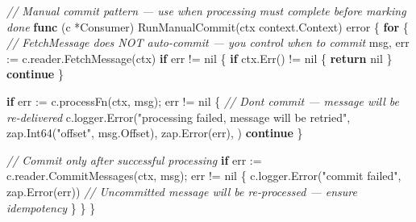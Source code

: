 \documentclass[
]{article}
\newenvironment{Shaded}{}{}
\newcommand{\CommentTok}[1]{\textcolor[rgb]{0.38,0.63,0.69}{\textit{#1}}}
\newcommand{\ControlFlowTok}[1]{\textcolor[rgb]{0.00,0.44,0.13}{\textbf{#1}}}
\newcommand{\DataTypeTok}[1]{\textcolor[rgb]{0.56,0.13,0.00}{#1}}
\newcommand{\KeywordTok}[1]{\textcolor[rgb]{0.00,0.44,0.13}{\textbf{#1}}}
\newcommand{\NormalTok}[1]{#1}
\newcommand{\OperatorTok}[1]{\textcolor[rgb]{0.40,0.40,0.40}{#1}}
\newcommand{\OtherTok}[1]{\textcolor[rgb]{0.00,0.44,0.13}{#1}}
\newcommand{\StringTok}[1]{\textcolor[rgb]{0.25,0.44,0.63}{#1}}
\begin{document}
\begin{Shaded}
\begin{Highlighting}[]
\CommentTok{// Manual commit pattern — use when processing must complete before marking done}
\KeywordTok{func} \OperatorTok{(}\NormalTok{c }\OperatorTok{*}\NormalTok{Consumer}\OperatorTok{)}\NormalTok{ RunManualCommit}\OperatorTok{(}\NormalTok{ctx context}\OperatorTok{.}\NormalTok{Context}\OperatorTok{)} \DataTypeTok{error} \OperatorTok{\{}
    \ControlFlowTok{for} \OperatorTok{\{}
        \CommentTok{// FetchMessage does NOT auto{-}commit — you control when to commit}
\NormalTok{        msg}\OperatorTok{,}\NormalTok{ err }\OperatorTok{:=}\NormalTok{ c}\OperatorTok{.}\NormalTok{reader}\OperatorTok{.}\NormalTok{FetchMessage}\OperatorTok{(}\NormalTok{ctx}\OperatorTok{)}
        \ControlFlowTok{if}\NormalTok{ err }\OperatorTok{!=} \OtherTok{nil} \OperatorTok{\{}
            \ControlFlowTok{if}\NormalTok{ ctx}\OperatorTok{.}\NormalTok{Err}\OperatorTok{()} \OperatorTok{!=} \OtherTok{nil} \OperatorTok{\{}
                \ControlFlowTok{return} \OtherTok{nil}
            \OperatorTok{\}}
            \ControlFlowTok{continue}
        \OperatorTok{\}}

        \ControlFlowTok{if}\NormalTok{ err }\OperatorTok{:=}\NormalTok{ c}\OperatorTok{.}\NormalTok{processFn}\OperatorTok{(}\NormalTok{ctx}\OperatorTok{,}\NormalTok{ msg}\OperatorTok{);}\NormalTok{ err }\OperatorTok{!=} \OtherTok{nil} \OperatorTok{\{}
            \CommentTok{// Don\textquotesingle{}t commit — message will be re{-}delivered}
\NormalTok{            c}\OperatorTok{.}\NormalTok{logger}\OperatorTok{.}\NormalTok{Error}\OperatorTok{(}\StringTok{"processing failed, message will be retried"}\OperatorTok{,}
\NormalTok{                zap}\OperatorTok{.}\NormalTok{Int64}\OperatorTok{(}\StringTok{"offset"}\OperatorTok{,}\NormalTok{ msg}\OperatorTok{.}\NormalTok{Offset}\OperatorTok{),}
\NormalTok{                zap}\OperatorTok{.}\NormalTok{Error}\OperatorTok{(}\NormalTok{err}\OperatorTok{),}
            \OperatorTok{)}
            \ControlFlowTok{continue}
        \OperatorTok{\}}

        \CommentTok{// Commit only after successful processing}
        \ControlFlowTok{if}\NormalTok{ err }\OperatorTok{:=}\NormalTok{ c}\OperatorTok{.}\NormalTok{reader}\OperatorTok{.}\NormalTok{CommitMessages}\OperatorTok{(}\NormalTok{ctx}\OperatorTok{,}\NormalTok{ msg}\OperatorTok{);}\NormalTok{ err }\OperatorTok{!=} \OtherTok{nil} \OperatorTok{\{}
\NormalTok{            c}\OperatorTok{.}\NormalTok{logger}\OperatorTok{.}\NormalTok{Error}\OperatorTok{(}\StringTok{"commit failed"}\OperatorTok{,}\NormalTok{ zap}\OperatorTok{.}\NormalTok{Error}\OperatorTok{(}\NormalTok{err}\OperatorTok{))}
            \CommentTok{// Uncommitted message will be re{-}processed — ensure idempotency}
        \OperatorTok{\}}
    \OperatorTok{\}}
\OperatorTok{\}}
\end{Highlighting}
\end{Shaded}
\end{document}
